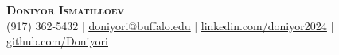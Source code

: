 \documentclass[letterpaper,11pt]{article}
\begin{document}

\begin{center}
    \textbf{\Huge \scshape Doniyor Ismatilloev} \\ \vspace{1pt}
    \small (917) 362-5432 $|$ \href{mailto:x@x.com}{\underline{doniyori@buffalo.edu}} $|$ 
    \href{https://www.linkedin.com/in/doniyor2024/}{\underline{linkedin.com/doniyor2024}} $|$
    \href{https://github.com/Doniyori}{\underline{github.com/Doniyori}}
\end{center}


\end{document}
